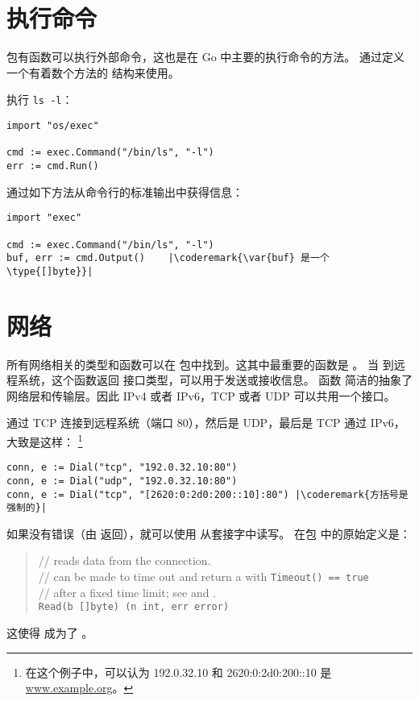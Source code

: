 \section{执行命令}
 包有函数可以执行外部命令，这也是在 Go 中主要的执行命令的方法。
通过定义一个有着数个方法的  结构来使用。

执行 \verb|ls -l|：
\begin{lstlisting}
import "os/exec"

cmd := exec.Command("/bin/ls", "-l")
err := cmd.Run()
\end{lstlisting}
通过如下方法从命令行的标准输出中获得信息：
\begin{lstlisting}
import "exec"

cmd := exec.Command("/bin/ls", "-l")
buf, err := cmd.Output()    |\coderemark{\var{buf} 是一个 \type{[]byte}}|
\end{lstlisting}

\section{网络}
所有网络相关的类型和函数可以在  包中找到。这其中最重要的函数是 。
当  到远程系统，这个函数返回  接口类型，可以用于发送或接收信息。
函数  简洁的抽象了网络层和传输层。因此 IPv4 或者 IPv6，TCP 或者 UDP 可以共用一个接口。

通过 TCP 连接到远程系统（端口 80），然后是 UDP，最后是 TCP 通过 IPv6，大致是这样：
\footnote{在这个例子中，可以认为 192.0.32.10 和 2620:0:2d0:200::10 是 \url{www.example.org}。}
\begin{lstlisting}
conn, e := Dial("tcp", "192.0.32.10:80")
conn, e := Dial("udp", "192.0.32.10:80")
conn, e := Dial("tcp", "[2620:0:2d0:200::10]:80") |\coderemark{方括号是强制的}|
\end{lstlisting}

如果没有错误（由  返回），就可以使用  从套接字中读写。
在包  中的原始定义是：
\begin{quote}
//  reads data from the connection.\\
//  can be made to time out and return a  with \lstinline{Timeout() == true}\\
// after a fixed time limit; see  and .\\
\lstinline{Read(b []byte) (n int, err error)}
\end{quote}
这使得  成为了 。

